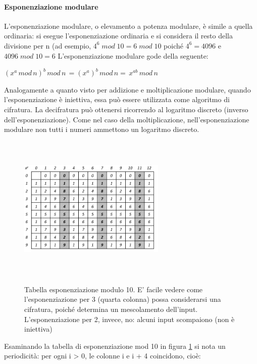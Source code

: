 \paragraph{Esponenziazione modulare}
L'esponenziazione modulare, o elevamento a potenza modulare, è simile a quella ordinaria: si esegue l'esponenziazione ordinaria e si considera il resto della divisione per n (ad esempio, $4^6 \; mod \; 10 = 6 \; mod \; 10$ poiché $4^6 = 4096$ e $4096 \; mod \; 10 = 6$
\newline \newline 
L'esponenziazione modulare gode della seguente:
\begin{prop} \label{prop:exp1}
$(x^a \, mod \, n)^b \, mod \, n \, =  (x^{a})^b \, mod \, n =  \, x^{ab} \, mod \, n$
\end{prop}
Analogamente a quanto visto per addizione e moltiplicazione modulare, quando l'esponenziazione è iniettiva, essa può essere utilizzata come algoritmo di cifratura. La decifratura può ottenersi ricorrendo al logaritmo discreto
(inverso dell'esponenziazione). Come nel caso della moltiplicazione, nell'esponenziazione modulare non tutti i numeri ammettono un logaritmo discreto.
\begin{figure}[htbp]
	\centering%
	\subfigure%
	{\includegraphics[height=7cm, width=7cm, keepaspectratio]{Immagini/chiave_pubblica/exp_mod.png}}
	\caption{Tabella esponenziazione modulo 10. E' facile vedere come l'esponenziazione per 3 (quarta colonna) possa considerarsi una cifratura, poiché determina un mescolamento dell’input. L'esponenziazione per 2, invece, no: alcuni input scompaiono (non è iniettiva) \label{fig:exp_mod}} 	
\end{figure}
\newline \newline
Esaminando la tabella di esponenziazione mod 10 in figura \ref{fig:exp_mod} si nota un periodicità: per ogni i > 0, le colonne i e i + 4 coincidono, cioè:
